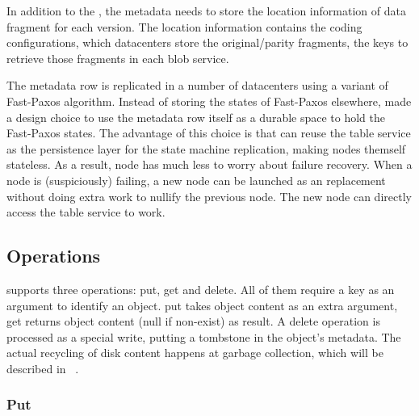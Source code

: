 In addition to the , the metadata needs to store the
location information of data fragment for each version. The location information contains
the coding configurations, which datacenters store the original/parity fragments, the keys
to retrieve those fragments in each blob service.

The metadata row is replicated in a number of datacenters using a variant of Fast-Paxos
algorithm. Instead of storing the states of Fast-Paxos elsewhere, {\name} made a design
choice to use the metadata row itself as a durable space to hold the Fast-Paxos states.
The advantage of this choice is that {\name} can reuse the table service as the persistence
layer for the state machine replication, making {\name} nodes themself stateless. As a
result, {\name} node has much less to worry about failure recovery. When a {\name} node
is (suspiciously) failing, a new {\name} node can be launched as an replacement without
doing extra work to nullify the previous node. The new node can directly access the table
service to work. 



\subsection{{\name} Operations}

{\name} supports three operations: put, get and delete. All of them require a key as
an argument to identify an object. put takes object content as an extra argument, get
returns object content (null if non-exist) as result. A delete operation is processed
as a special write, putting a tombstone in the object's metadata. The actual recycling
of disk content happens at garbage collection, which will be described in ~.

\subsubsection{Put}

